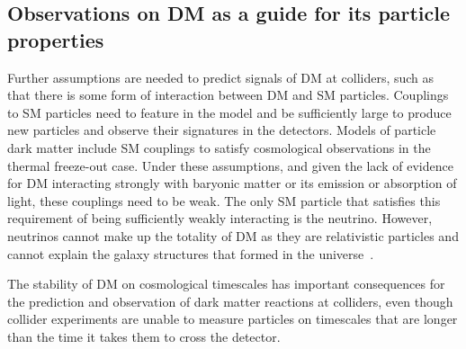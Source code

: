 \begin{textbox}[!h]
\section{Observations on DM as a guide for its particle properties}



Further assumptions are needed to predict signals of DM at colliders, such as that there is some form of interaction between DM and SM particles. 
Couplings to SM particles need to feature in the model and be sufficiently large to produce new particles and observe their signatures in the detectors. 
Models of particle dark matter include SM couplings to satisfy cosmological observations in the thermal freeze-out case. 
Under these assumptions, and given the lack of evidence for DM interacting strongly with baryonic matter or its emission or absorption of light, these couplings need to be weak. 
The only SM particle that satisfies this requirement of being sufficiently weakly interacting is the neutrino.
However, neutrinos cannot make up the totality of DM as they are relativistic particles and cannot explain the galaxy structures that formed in the  universe~\cite{PlehnLecturesDM}. 



The stability of DM on cosmological timescales has important consequences for the prediction and observation of dark matter reactions at colliders, even though collider experiments are unable to measure particles on timescales that are longer than the time it takes them to cross the detector. 


\end{textbox}
